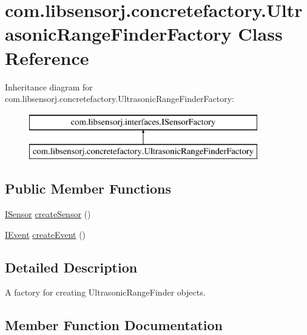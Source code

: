\hypertarget{classcom_1_1libsensorj_1_1concretefactory_1_1UltrasonicRangeFinderFactory}{}\section{com.\+libsensorj.\+concretefactory.\+Ultrasonic\+Range\+Finder\+Factory Class Reference}
\label{classcom_1_1libsensorj_1_1concretefactory_1_1UltrasonicRangeFinderFactory}
Inheritance diagram for com.\+libsensorj.\+concretefactory.\+Ultrasonic\+Range\+Finder\+Factory\+:\begin{figure}[H]
\begin{center}
\leavevmode
\includegraphics[height=2.000000cm]{classcom_1_1libsensorj_1_1concretefactory_1_1UltrasonicRangeFinderFactory}
\end{center}
\end{figure}
\subsection*{Public Member Functions}
\begin{DoxyCompactItemize}
\item 
\hyperlink{interfacecom_1_1libsensorj_1_1interfaces_1_1ISensor}{I\+Sensor} \hyperlink{classcom_1_1libsensorj_1_1concretefactory_1_1UltrasonicRangeFinderFactory_a3aa6e46ef47bf97355df4d5cfb1b1e01}{create\+Sensor} ()
\item 
\hyperlink{classcom_1_1libsensorj_1_1interfaces_1_1IEvent}{I\+Event} \hyperlink{classcom_1_1libsensorj_1_1concretefactory_1_1UltrasonicRangeFinderFactory_a8a7d0c55346f1ab5630a878f6a3175fd}{create\+Event} ()
\end{DoxyCompactItemize}


\subsection{Detailed Description}
A factory for creating Ultrasonic\+Range\+Finder objects. 

\subsection{Member Function Documentation}
\hypertarget{classcom_1_1libsensorj_1_1concretefactory_1_1UltrasonicRangeFinderFactory_a8a7d0c55346f1ab5630a878f6a3175fd}{}
